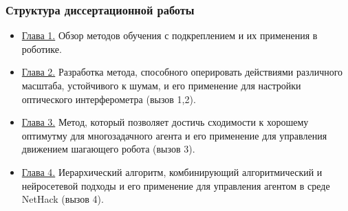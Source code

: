 \begin{frame}
    \frametitle{Структура диссертационной работы}
    \begin{itemize}
        \item \underline{Глава 1.} Обзор методов обучения с подкреплением и их применения в роботике. 
        \item \underline{Глава 2.} Разработка метода, способного оперировать действиями различного масштаба, устойчивого к шумам, и его применение для настройки оптического интерферометра (вызов 1,2).
        \item \underline{Глава 3.} Метод, который позволяет достичь сходимости к хорошему оптимутму для многозадачного агента и его применение  для управления движением шагающего робота (вызов 3).
        \item \underline{Глава 4.} Иерархический алгоритм, комбинирующий алгоритмический и нейросетевой подходы и его применение для управления агентом в среде NetHack (вызов 4).
    \end{itemize}
\end{frame}

